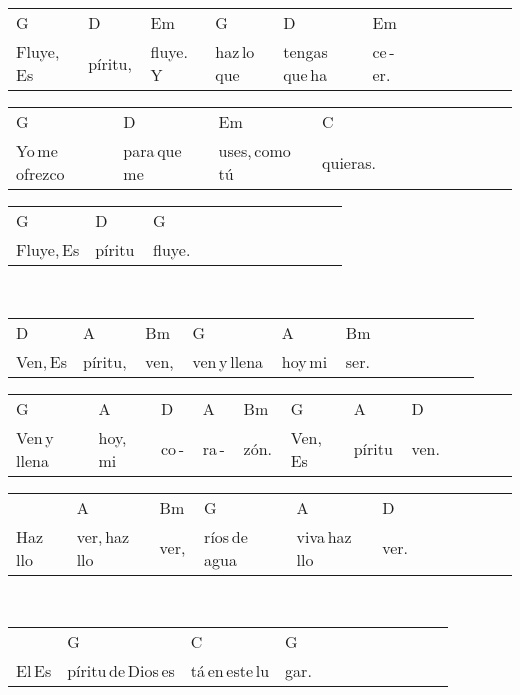 \hfill
\begin{multicols}{2}
\noindent
\begin{minipage}{\columnwidth}
\noindent
\noindent
\begin{tabular}{llllllllllll}
G&D&Em&G&D&Em\\
Fluye,\,Es&píritu,\,&fluye.\,Y\,&haz\,lo\,que\,&tengas\,que\,ha&ce\,-\,er.
\end{tabular}

\noindent
\begin{tabular}{llllllllllll}
G&D&Em&C\\
Yo\,me\,ofrezco\,&para\,que\,me\,&uses,\,como\,tú\,&quieras.
\end{tabular}

\noindent
\begin{tabular}{llllllllllll}
G&D&G\\
Fluye,\,Es&píritu\,&fluye.
\end{tabular}
\end{minipage}\\

\noindent
\begin{minipage}{\columnwidth}
\noindent
\noindent
\begin{tabular}{llllllllllll}
D&A&Bm&G&A&Bm\\
Ven,\,Es&píritu,\,&ven,\,&ven\,y\,llena\,&hoy\,mi\,&ser.
\end{tabular}

\noindent
\begin{tabular}{llllllllllll}
G&A&D&A&Bm&G&A&D\\
Ven\,y\,llena\,&hoy,\,mi\,&co\,-\,&ra\,-\,&zón.\,&Ven,\,Es&píritu\,&ven.
\end{tabular}

\noindent
\begin{tabular}{llllllllllll}
&A&Bm&G&A&D\\
Haz\,llo&ver,\,haz\,llo&ver,\,&ríos\,de\,agua\,&viva\,haz\,llo&ver.
\end{tabular}
\end{minipage}\\

\noindent
\begin{minipage}{\columnwidth}
\noindent
\noindent
\begin{tabular}{llllllllllll}
&G&C&G\\
El\,Es&píritu\,de\,Dios\,es&tá\,en\,este\,lu&gar.
\end{tabular}


\end{minipage}
\end{multicols}
